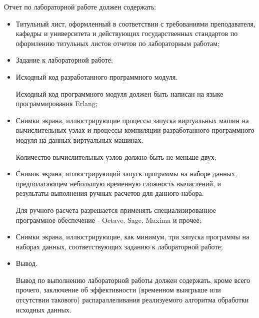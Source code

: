 
Отчет по лабораторной работе должен содержать:

\begin{itemize}

	\item Титульный лист, оформленный в соответствии с требованиями преподавателя, кафедры и университета и действующих государственных стандартов по оформлению титульных листов отчетов по лабораторным работам;
	
	\item Задание к лабораторной работе;

	\item Исходный код разработанного программного модуля.

	Исходный код программного модуля должен быть написан на языке программирования Erlang;

	\item Снимки экрана, иллюстрирующие процессы запуска виртуальных машин на вычислительных узлах и процессы компиляции разработанного программного модуля на данных виртуальных машинах.

	Количество вычислительных узлов должно быть не меньше двух;

	\item Снимок экрана, иллюстрирующий запуск программы на наборе данных, предполагающем небольшую временную сложность вычислений, и результаты выполнения ручных расчетов для данного набора.

	Для ручного расчета разрешается применять специализированное программное обеспечение - Octave, Sage, Maxima и прочее;

	\item Снимки экрана, иллюстрирующие, как минимум, три запуска программы на наборах данных, соответствующих заданию к лабораторной работе;

	\item Вывод.

	Вывод по выполнению лабораторной работы должен содержать, кроме всего прочего, заключение об эффективности (временном выигрыше или отсутствии такового) распараллеливания реализуемого алгоритма обработки исходных данных.

\end{itemize}

